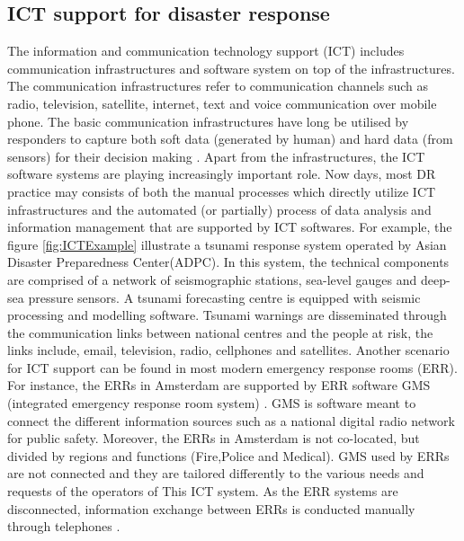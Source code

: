 \subsection{ICT support for disaster response}
The information and communication technology support (ICT) includes communication infrastructures and software system on top of the infrastructures. The communication infrastructures refer to communication channels such as radio, television, satellite, internet, text and voice communication over mobile phone. The basic communication infrastructures have long be utilised by responders to capture both soft data (generated by human) and hard data (from sensors) for their decision making \cite{Fischer2012}. Apart from the infrastructures, the ICT software systems are playing increasingly important role. Now days, most DR practice may consists  of both the manual processes which directly utilize ICT infrastructures and the automated (or partially) process of data analysis and information management that are supported by ICT softwares. For example, the figure \ref{fig:ICTExample} illustrate a tsunami response system operated by Asian Disaster Preparedness Center(ADPC). In this system,  the technical components are comprised of a network of seismographic stations, sea-level gauges and deep-sea pressure sensors. A tsunami forecasting centre is equipped with seismic processing and modelling software.  Tsunami warnings are disseminated through the communication links between national centres and the people at risk, the links include, email, television, radio, cellphones and satellites. Another scenario for ICT support can be found in most modern emergency response rooms (ERR). For instance, the ERRs in Amsterdam are supported by ERR software GMS (integrated emergency response room system) \cite{Boersma2009}. GMS is software meant to connect the different information sources such as a national digital radio network for public safety. Moreover, the ERRs in Amsterdam is not co-located, but divided by regions and functions (Fire,Police and Medical). GMS used by ERRs are not connected and they are tailored differently to the various needs and requests of the operators of This ICT system. As the ERR systems are disconnected, information exchange between ERRs is conducted manually through telephones \cite{Boersma2009}.\\

